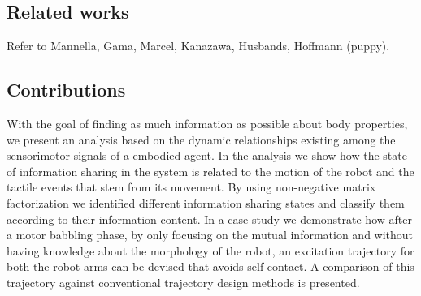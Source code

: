 
\subsection{Related works}

Refer to Mannella, Gama, Marcel, Kanazawa, Husbands, Hoffmann (puppy).

\subsection{Contributions}
With the goal of finding as much information as possible about body properties, we present an analysis based on the dynamic relationships existing among the sensorimotor signals of a embodied agent. In the analysis we show how the state of information sharing in the system is related to the motion of the robot and the tactile events that stem from its movement. By using non-negative matrix factorization we identified different information sharing states and classify them according to their information content. In a case study we demonstrate how after a motor babbling phase, by only focusing on the mutual information and without having knowledge about the morphology of the robot, an excitation trajectory for both the robot arms can be devised that avoids self contact. A comparison of this trajectory against conventional trajectory design methods is presented.


